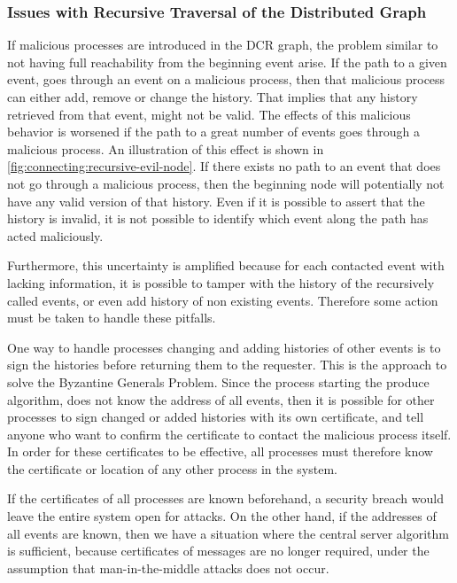 	\subsubsection{Issues with Recursive Traversal of the Distributed Graph}
	If malicious processes are introduced in the DCR graph, the problem similar to not having full reachability from the beginning event arise. If the path to a given event, goes through an event on a malicious process, then that malicious process can either add, remove or change the history. That implies that any history retrieved from that event, might not be valid. The effects of this malicious behavior is worsened if the path to a great number of events goes through a malicious process. An illustration of this effect is shown in \autoref{fig:connecting:recursive-evil-node}. If there exists no path to an event that does not go through a malicious process, then the beginning node will potentially not have any valid version of that history. Even if it is possible to assert that the history is invalid, it is not possible to identify which event along the path has acted maliciously.
	
	\newpar Furthermore, this uncertainty is amplified because for each contacted event with lacking information, it is possible to tamper with the history of the recursively called events, or even add history of non existing events. Therefore some action must be taken to handle these pitfalls.
	
	\newpar One way to handle processes changing and adding histories of other events is to sign the histories before returning them to the requester. This is the approach to solve the Byzantine Generals Problem. Since the process starting the produce algorithm, does not know the address of all events, then it is possible for other processes to sign changed or added histories with its own certificate, and tell anyone who want to confirm the certificate to contact the malicious process itself. In order for these certificates to be effective, all processes must therefore know the certificate or location of any other process in the system.
	
	\newpar If the certificates of all processes are known beforehand, a security breach would leave the entire system open for attacks. On the other hand, if the addresses of all events are known, then we have a situation where the central server algorithm is sufficient, because certificates of messages are no longer required, under the assumption that man-in-the-middle attacks does not occur.
	
